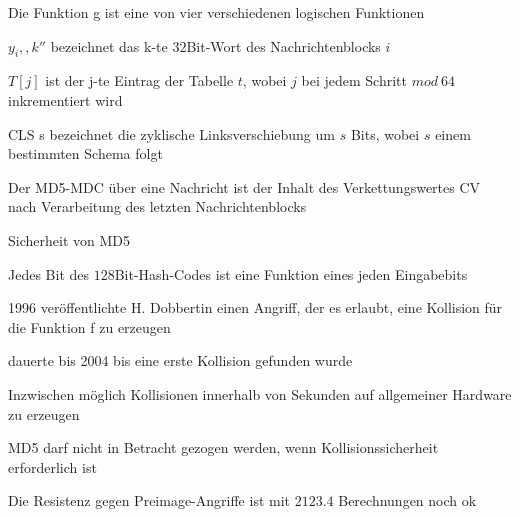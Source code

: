 \documentclass[a4paper]{article}
\begin{document}
\begin{multicols}{3}
\begin{itemize*}
            \item Die Funktion g ist eine von vier verschiedenen logischen Funktionen
            \item $y_i,,k''$ bezeichnet das k-te $32$Bit-Wort des Nachrichtenblocks $i$
            \item $T[j]$ ist der j-te Eintrag der Tabelle $t$, wobei $j$ bei jedem Schritt $mod\ 64$ inkrementiert wird
            \item CLS s bezeichnet die zyklische Linksverschiebung um $s$ Bits, wobei $s$ einem bestimmten Schema folgt
            \item Der MD5-MDC über eine Nachricht ist der Inhalt des Verkettungswertes CV nach Verarbeitung des letzten Nachrichtenblocks
            \item Sicherheit von MD5
            \begin{itemize*}
                  \item Jedes Bit des $128$Bit-Hash-Codes ist eine Funktion eines jeden Eingabebits
                  \item 1996 veröffentlichte H. Dobbertin einen Angriff, der es erlaubt, eine Kollision für die Funktion f zu erzeugen %
                  \item dauerte bis 2004 bis eine erste Kollision gefunden wurde
                  \item Inzwischen möglich Kollisionen innerhalb von Sekunden auf allgemeiner Hardware zu erzeugen
                  \item MD5 darf nicht in Betracht gezogen werden, wenn Kollisionssicherheit erforderlich ist
                  \item Die Resistenz gegen Preimage-Angriffe ist mit $2123.4$ Berechnungen noch ok
            \end{itemize*}
      \end{itemize*}


\end{multicols}
\end{document}

